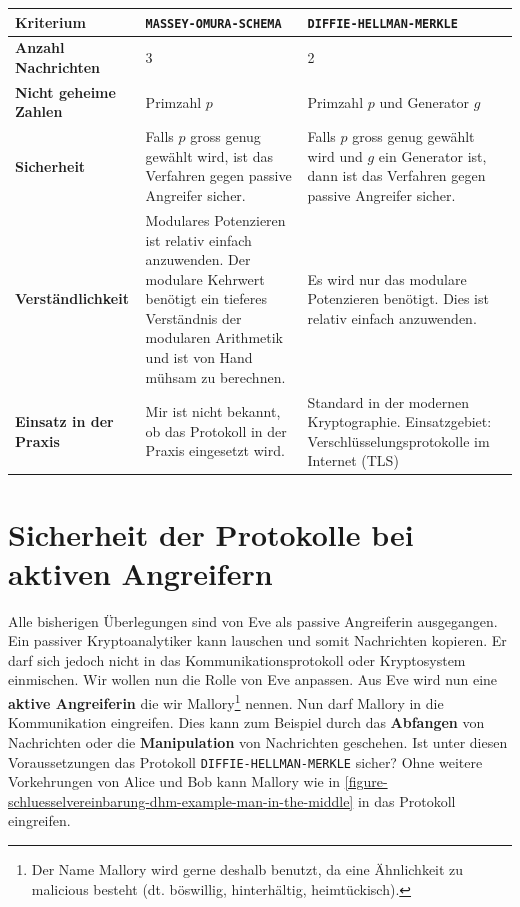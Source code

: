 \begin{table}[htb]
\centering
\begin{tabular}{|p{3.5cm}|p{5cm}|p{5.5cm}|}
\hline
\textbf{Kriterium} & \texttt{MASSEY-OMURA-SCHEMA} & \texttt{DIFFIE-HELLMAN-MERKLE} \\ \hline
\textbf{Anzahl Nachrichten} & 3 & 2 \\ \hline
\textbf{Nicht geheime Zahlen} & Primzahl $p$ & Primzahl $p$ und Generator $g$ \\ \hline
\textbf{Sicherheit} & Falls $p$ gross genug gewählt wird, ist das Verfahren gegen passive Angreifer sicher.                                                                               & Falls $p$ gross genug gewählt wird und $g$ ein Generator ist, dann ist das Verfahren gegen passive Angreifer sicher. \\ \hline
\textbf{Verständlichkeit} & Modulares Potenzieren ist relativ einfach anzuwenden. Der modulare Kehrwert benötigt ein tieferes Verständnis der modularen Arithmetik und ist von Hand mühsam zu berechnen. & Es wird nur das modulare Potenzieren benötigt. Dies ist relativ einfach anzuwenden. \\ \hline
\textbf{Einsatz in der Praxis} & Mir ist nicht bekannt, ob das Protokoll in der Praxis eingesetzt wird. & Standard in der modernen Kryptographie. Einsatzgebiet: Verschlüsselungsprotokolle im Internet (\ac{TLS}) \\ \hline
\end{tabular}
\end{table}

\section{Sicherheit der Protokolle bei aktiven Angreifern}

Alle bisherigen Überlegungen sind von Eve als passive Angreiferin ausgegangen. Ein passiver Kryptoanalytiker kann lauschen und somit Nachrichten kopieren. Er darf sich jedoch nicht in das Kommunikationsprotokoll oder Kryptosystem einmischen. Wir wollen nun die Rolle von Eve anpassen. Aus Eve wird nun eine \textbf{aktive Angreiferin} die wir Mallory\footnote{Der Name Mallory wird gerne deshalb benutzt, da eine Ähnlichkeit zu malicious besteht (dt. böswillig, hinterhältig, heimtückisch).} nennen. Nun darf Mallory in die Kommunikation eingreifen. Dies kann zum Beispiel durch das \textbf{Abfangen} von Nachrichten oder die \textbf{Manipulation} von Nachrichten geschehen. Ist unter diesen Voraussetzungen das Protokoll \texttt{DIFFIE-HELLMAN-MERKLE} sicher? Ohne weitere Vorkehrungen von Alice und Bob kann Mallory wie in \autoref{figure-schluesselvereinbarung-dhm-example-man-in-the-middle} in das Protokoll eingreifen.

